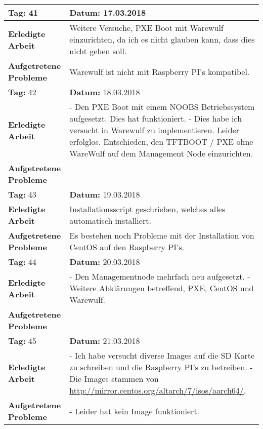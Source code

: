 \begin{longtable}{|p{5cm}|p{5cm}p{6cm}|}
\rowcolor{heading}\textbf{Tag:} 41 & \textbf{Datum:} 17.03.2018 & \\ \hline
\textbf{Erledigte Arbeit} & \multicolumn{2}{p{11cm}|}{Weitere Versuche, PXE Boot mit Warewulf einzurichten, da ich es nicht glauben kann, dass dies nicht gehen soll.} \\ \hline
\textbf{Aufgetretene Probleme} & \multicolumn{2}{p{11cm}|}{Warewulf ist nicht mit Raspberry PI's kompatibel.} \\ \hline
\rowcolor{heading}\textbf{Tag:} 42 & \textbf{Datum:} 18.03.2018 & \\ \hline
\textbf{Erledigte Arbeit} & \multicolumn{2}{p{11cm}|}{- Den PXE Boot mit einem NOOBS Betriebssystem aufgesetzt. Dies hat funktioniert. \newline
- Dies habe ich versucht in Warewulf zu implementieren. Leider erfolglos. \newline
Entschieden, den TFTBOOT / PXE ohne WareWulf auf dem Management Node einzurichten.} \\ \hline
\textbf{Aufgetretene Probleme} & \multicolumn{2}{p{11cm}|}{} \\ \hline
\rowcolor{heading}\textbf{Tag:} 43 & \textbf{Datum:} 19.03.2018 & \\ \hline
\textbf{Erledigte Arbeit} & \multicolumn{2}{p{11cm}|}{Installationsscript geschrieben, welches alles automatisch installiert.} \\ \hline
\textbf{Aufgetretene Probleme} & \multicolumn{2}{p{11cm}|}{Es bestehen noch Probleme mit der Installation von CentOS auf den Raspberry PI's.} \\ \hline
\rowcolor{heading}\textbf{Tag:} 44 & \textbf{Datum:} 20.03.2018 & \\ \hline
\textbf{Erledigte Arbeit} & \multicolumn{2}{p{11cm}|}{- Den Managementnode mehrfach neu aufgesetzt. \newline
- Weitere Abklärungen betreffend, PXE, CentOS und Warewulf.} \\ \hline
\textbf{Aufgetretene Probleme} & \multicolumn{2}{p{11cm}|}{} \\ \hline
\rowcolor{heading}\textbf{Tag:} 45 & \textbf{Datum:} 21.03.2018 & \\ \hline
\textbf{Erledigte Arbeit} & \multicolumn{2}{p{11cm}|}{- Ich habe versucht diverse Images auf die SD Karte zu schreiben und die Raspberry PI's zu betreiben. \newline
- Die Images stammen von \url{http://mirror.centos.org/altarch/7/isos/aarch64/}.} \\ \hline
\textbf{Aufgetretene Probleme} & \multicolumn{2}{p{11cm}|}{- Leider hat kein Image funktioniert. \newline
}
\end{longtable}
